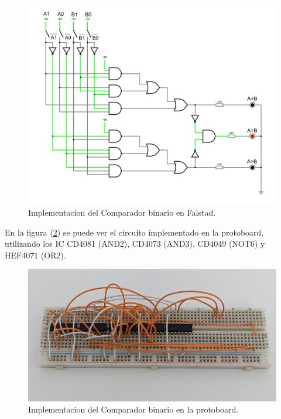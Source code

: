 \documentclass[]{informeutn}
\begin{document}
    \begin{figure}[!ht]
      \centering
      \includegraphics[width=1\textwidth]{images/ej2.png}
      \caption{Implementacion del Comparador binario en Falstad.}
      \label{falstad.ej2}
    \end{figure}

    En la figura (\ref{crkt.ej2.prot}) se puede ver el circuito implementado en la protoboard, utilizando los IC CD4081
    (AND2), CD4073 (AND3), CD4049 (NOT6) y HEF4071 (OR2).

    \begin{figure}[!ht]
      \centering
      \includegraphics[width=.8\textwidth]{pictures/prot-ej2.jpg}
      \caption{Implementacion del Comparador binario en la protoboard.}
      \label{crkt.ej2.prot}
    \end{figure}
\end{document}
